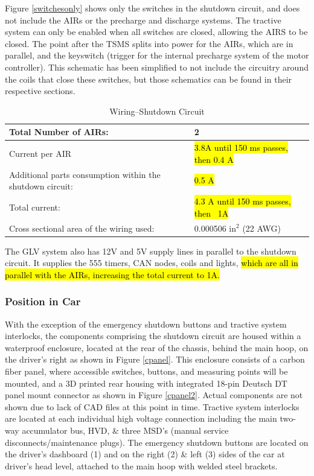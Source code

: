 \documentclass{article}
\DeclareRobustCommand{\hlr}[1]{{\sethlcolor{red}\hl{#1}}}
\begin{document}
            Figure \ref{switchesonly} shows only the switches in the shutdown circuit, and does not include the AIRs or the precharge and discharge systems. The tractive system can only be enabled when all switches are closed, allowing the AIRS to be closed. The point after the TSMS splits into power for the AIRs, which are in parallel, and the keyswitch (trigger for the internal precharge system of the motor controller). This schematic has been simplified to not include the circuitry around the coils that close these switches, but those schematics can be found in their respective sections.
            
            \begin{table}[H]
                \centering
                \begin{tabular}{|l|l|}
                \hline
                    Total Number of AIRs: & 2 \\ \hline
                    Current per AIR & \hlr{ 3.8A until 150 ms passes, then 0.4 A} \\ \hline
                    Additional parts consumption within the shutdown circuit: & \hlr{0.5 A }\\ \hline
                    Total current: & \hlr{4.3 A until 150 ms passes, then ~1A} \\ \hline
                    Cross sectional area of the wiring used: & 0.000506 in$^{2}$ (22 AWG) \\ \hline
                \end{tabular}
                \caption{Wiring--Shutdown Circuit}
                \label{ShutdownCircuitTable}
            \end{table}
            
            The GLV system also has 12V and 5V supply lines in parallel to the shutdown circuit. It supplies the 555 timers, CAN nodes, coils and lights, \hlr{ which are all in parallel with the AIRs, increasing the total current to 1A. }
            
        \subsubsection{Position in Car}

            With the exception of the emergency shutdown buttons and tractive system interlocks, the components comprising the shutdown circuit are housed within a waterproof enclosure, located at the rear of the chassis, behind the main hoop, on the driver's right as shown in Figure \ref{cpanel}. This enclosure consists of a carbon fiber panel, where accessible switches, buttons, and measuring points will be mounted, and a 3D printed rear housing with integrated 18-pin Deutsch DT panel mount connector as shown in Figure \ref{cpanel2}. Actual components are not shown due to lack of CAD files at this point in time. Tractive system interlocks are located at each individual high voltage connection including the main two-way accumulator bus, HVD, \& three MSD's (manual service disconnects/maintenance plugs). The emergency shutdown buttons are located on the driver's dashboard (1) and on the right (2) \& left (3) sides of the car at driver's head level, attached to the main hoop with welded steel brackets.
\end{document}

